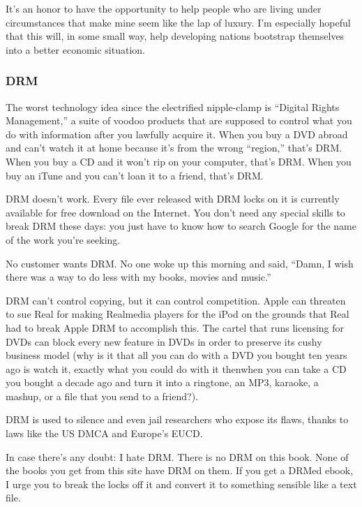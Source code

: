 It's an honor to have the opportunity to help people who are living
under circumstances that make mine seem like the lap of luxury.  I'm
especially hopeful that this will, in some small way, help developing
nations bootstrap themselves into a better economic situation.


\subsubsection{DRM}

The worst technology idea since the electrified nipple-clamp is
``Digital Rights Management,'' a suite of voodoo products that are
supposed to control what you do with information after you lawfully
acquire it.  When you buy a DVD abroad and can't watch it at home
because it's from the wrong ``region,'' that's DRM.  When you buy a CD
and it won't rip on your computer, that's DRM.  When you buy an iTune
and you can't loan it to a friend, that's DRM.

DRM doesn't work.  Every file ever released with DRM locks on it is
currently available for free download on the Internet.  You don't need
any special skills to break DRM these days:  you just have to know how
to search Google for the name of the work you're seeking.

No customer wants DRM.  No one woke up this morning and said, ``Damn,
I wish there was a way to do less with my books, movies and music.''

DRM can't control copying, but it can control competition.  Apple can
threaten to sue Real for making Realmedia players for the iPod on the
grounds that Real had to break Apple DRM to accomplish this.  The
cartel that runs licensing for DVDs can block every new feature in
DVDs in order to preserve its cushy business model (why is it that all
you can do with a DVD you bought ten years ago is watch it, exactly
what you could do with it then\dash{}when you can take a CD you bought a
decade ago and turn it into a ringtone, an MP3, karaoke, a mashup, or
a file that you send to a friend?).

DRM is used to silence and even jail researchers who expose its flaws,
thanks to laws like the US DMCA and Europe's EUCD. 

In case there's any doubt:  I hate DRM.  There is no DRM on this book. 
None of the books you get from this site have DRM on them.  If you get
a DRMed ebook, I urge you to break the locks off it and convert it to
something sensible like a text file. 

